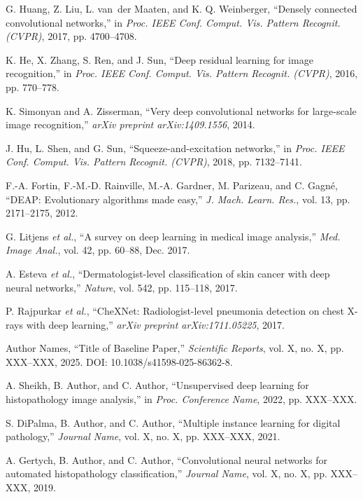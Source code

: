 \documentclass[journal]{IEEEtran}
\begin{document}
\begin{thebibliography}{00}
 G. Huang, Z. Liu, L. van~der Maaten, and K. Q. Weinberger, ``Densely connected convolutional networks,'' in \emph{Proc. IEEE Conf. Comput. Vis. Pattern Recognit. (CVPR)}, 2017, pp. 4700--4708.

 K. He, X. Zhang, S. Ren, and J. Sun, ``Deep residual learning for image recognition,'' in \emph{Proc. IEEE Conf. Comput. Vis. Pattern Recognit. (CVPR)}, 2016, pp. 770--778.

 K. Simonyan and A. Zisserman, ``Very deep convolutional networks for large-scale image recognition,'' \emph{arXiv preprint arXiv:1409.1556}, 2014.

 J. Hu, L. Shen, and G. Sun, ``Squeeze-and-excitation networks,'' in \emph{Proc. IEEE Conf. Comput. Vis. Pattern Recognit. (CVPR)}, 2018, pp. 7132--7141.

 F.-A. Fortin, F.-M.-D. Rainville, M.-A. Gardner, M. Parizeau, and C. Gagné, ``DEAP: Evolutionary algorithms made easy,'' \emph{J. Mach. Learn. Res.}, vol. 13, pp. 2171--2175, 2012.

 G. Litjens \emph{et al.}, ``A survey on deep learning in medical image analysis,'' \emph{Med. Image Anal.}, vol. 42, pp. 60--88, Dec. 2017.

 A. Esteva \emph{et al.}, ``Dermatologist-level classification of skin cancer with deep neural networks,'' \emph{Nature}, vol. 542, pp. 115--118, 2017.

 P. Rajpurkar \emph{et al.}, ``CheXNet: Radiologist-level pneumonia detection on chest X-rays with deep learning,'' \emph{arXiv preprint arXiv:1711.05225}, 2017.

 Author Names, ``Title of Baseline Paper,'' \emph{Scientific Reports}, vol. X, no. X, pp. XXX--XXX, 2025. DOI: 10.1038/s41598-025-86362-8.

 A. Sheikh, B. Author, and C. Author, ``Unsupervised deep learning for histopathology image analysis,'' in \emph{Proc. Conference Name}, 2022, pp. XXX--XXX.

 S. DiPalma, B. Author, and C. Author, ``Multiple instance learning for digital pathology,'' \emph{Journal Name}, vol. X, no. X, pp. XXX--XXX, 2021.

 A. Gertych, B. Author, and C. Author, ``Convolutional neural networks for automated histopathology classification,'' \emph{Journal Name}, vol. X, no. X, pp. XXX--XXX, 2019.
\end{thebibliography}
\end{document}
